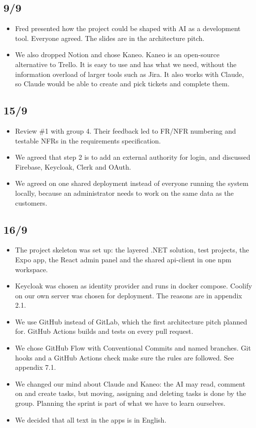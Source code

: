 \documentclass[a4paper,11pt]{article}
\begin{document}
\subsection*{9/9}
\begin{itemize}
    \item Fred presented how the project could be shaped with AI as a development tool. Everyone agreed. The slides are in the architecture pitch.
    \item We also dropped Notion and chose Kaneo. Kaneo is an open-source alternative to Trello. It is easy to use and has what we need, without the information overload of larger tools such as Jira. It also works with Claude, so Claude would be able to create and pick tickets and complete them.
\end{itemize}

\subsection*{15/9}
\begin{itemize}
    \item Review \#1 with group 4. Their feedback led to FR/NFR numbering and testable NFRs in the requirements specification.
    \item We agreed that step 2 is to add an external authority for login, and discussed Firebase, Keycloak, Clerk and OAuth.
    \item We agreed on one shared deployment instead of everyone running the system locally, because an administrator needs to work on the same data as the customers.
\end{itemize}

\subsection*{16/9}
\begin{itemize}
    \item The project skeleton was set up: the layered .NET solution, test projects, the Expo app, the React admin panel and the shared api-client in one npm workspace.
    \item Keycloak was chosen as identity provider and runs in docker compose. Coolify on our own server was chosen for deployment. The reasons are in appendix 2.1.
    \item We use GitHub instead of GitLab, which the first architecture pitch planned for. GitHub Actions builds and tests on every pull request.
    \item We chose GitHub Flow with Conventional Commits and named branches. Git hooks and a GitHub Actions check make sure the rules are followed. See appendix 7.1.
    \item We changed our mind about Claude and Kaneo: the AI may read, comment on and create tasks, but moving, assigning and deleting tasks is done by the group. Planning the sprint is part of what we have to learn ourselves.
    \item We decided that all text in the apps is in English.
\end{itemize}
\end{document}
